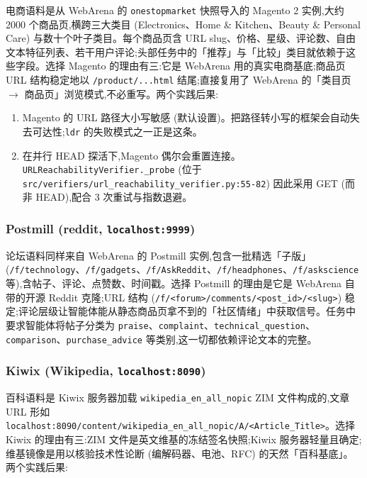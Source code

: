 \documentclass[UTF8,a4paper,12pt,oneside]{ctexart}
\begin{document}
电商语料是从 WebArena 的 \texttt{onestopmarket} 快照导入的 Magento 2 实例,大约 2000 个商品页,横跨三大类目 (Electronics、Home \& Kitchen、Beauty \& Personal Care) 与数十个叶子类目。每个商品页含 URL slug、价格、星级、评论数、自由文本特征列表、若干用户评论;头部任务中的「推荐」与「比较」类目就依赖于这些字段。选择 Magento 的理由有三:它是 WebArena 用的真实电商基底;商品页 URL 结构稳定地以 \texttt{/product/...html} 结尾;直接复用了 WebArena 的「类目页 \(\to\) 商品页」浏览模式,不必重写。两个实践后果:

\begin{enumerate}[leftmargin=2em]
\item Magento 的 URL 路径大小写敏感 (默认设置)。把路径转小写的框架会自动失去可达性;\texttt{ldr} 的失败模式之一正是这条。
\item 在并行 HEAD 探活下,Magento 偶尔会重置连接。\texttt{URLReachabilityVerifier.\_probe} (位于 \texttt{src/verifiers/url\_reachability\_verifier.py:55-82}) 因此采用 GET (而非 HEAD),配合 3 次重试与指数退避。
\end{enumerate}

\subsubsection{Postmill (reddit, \texttt{localhost:9999})}

论坛语料同样来自 WebArena 的 Postmill 实例,包含一批精选「子版」(\texttt{/f/technology}、\texttt{/f/gadgets}、\texttt{/f/AskReddit}、\texttt{/f/headphones}、\texttt{/f/askscience} 等),含帖子、评论、点赞数、时间戳。选择 Postmill 的理由是它是 WebArena 自带的开源 Reddit 克隆;URL 结构 (\texttt{/f/<forum>/comments/<post\_id>/<slug>}) 稳定;评论层级让智能体能从静态商品页拿不到的「社区情绪」中获取信号。任务中要求智能体将帖子分类为 \texttt{praise}、\texttt{complaint}、\texttt{technical\_question}、\texttt{comparison}、\texttt{purchase\_advice} 等类别,这一切都依赖评论文本的完整。

\subsubsection{Kiwix (Wikipedia, \texttt{localhost:8090})}

百科语料是 Kiwix 服务器加载 \texttt{wikipedia\_en\_all\_nopic} ZIM 文件构成的,文章 URL 形如 \texttt{localhost:8090/content/wikipedia\_en\_all\_nopic/A/<Article\_Title>}。选择 Kiwix 的理由有三:ZIM 文件是英文维基的冻结签名快照;Kiwix 服务器轻量且确定;维基镜像是用以核验技术性论断 (编解码器、电池、RFC) 的天然「百科基底」。两个实践后果:
\end{document}
